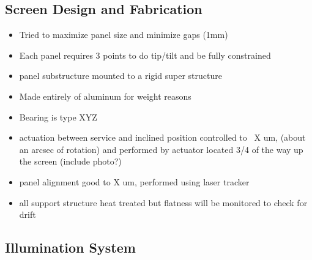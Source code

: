 \subsection{Screen Design and Fabrication}

\begin{itemize}
	\item Tried to maximize panel size and minimize gaps (1mm)
	\item Each panel requires 3 points to do tip/tilt and be fully constrained
	\item panel substructure mounted to a rigid super structure
	\item Made entirely of aluminum for weight reasons
	\item Bearing is type XYZ
	\item actuation between service and inclined position controlled to ~X um, (about an arcsec of rotation) and performed by actuator located 3/4 of the way up the screen (include photo?)
	\item panel alignment good to X um, performed using laser tracker
	\item all support structure heat treated but flatness will be monitored to check for drift
\end{itemize}

\subsection{Illumination System}

